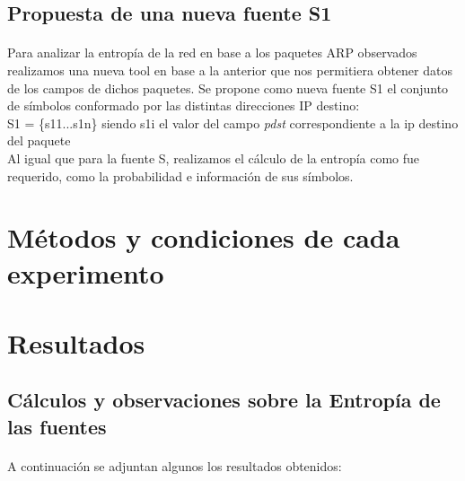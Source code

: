 \documentclass[11pt,a4paper]{article}
\begin{document}
\subsection{Propuesta de una nueva fuente S{\scriptsize 1}}
\paragraph{}
	Para analizar la entropía de la red en base a los paquetes ARP observados realizamos una nueva tool en base a la anterior que nos permitiera obtener datos de los campos de dichos paquetes. 
	Se propone como nueva fuente S1 el conjunto de símbolos conformado por las distintas direcciones IP destino:\\
	
	
		S{\scriptsize 1} = \{s{\scriptsize 1}{\tiny 1}...s{\scriptsize 1}{\tiny n}\} siendo s{\scriptsize 1}{\tiny i} el valor del campo \textit{pdst} correspondiente a la ip destino del paquete\\
		
	
	Al igual que para la fuente S, realizamos el cálculo de la entropía como fue requerido, como la probabilidad e información de sus símbolos.  

\newpage
\section{Métodos y condiciones de cada experimento}

\newpage
\section{Resultados}

\subsection{Cálculos y observaciones sobre la Entropía de las fuentes}
\paragraph{}	

	A continuación se adjuntan algunos los resultados obtenidos:
	
\end{document}
